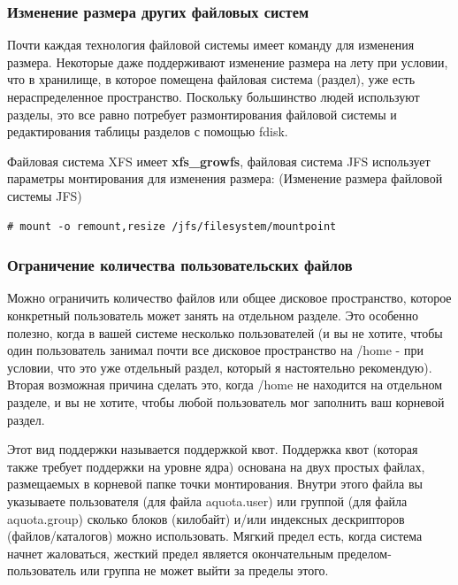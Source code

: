 \documentclass[10pt]{book}
\begin{document}
\subsubsection{Изменение размера других файловых систем}

Почти каждая технология файловой системы имеет команду для изменения размера. Некоторые даже поддерживают изменение размера на лету при условии, что в хранилище, в которое помещена файловая система (раздел), уже есть нераспределенное пространство. Поскольку большинство людей используют разделы, это все равно потребует размонтирования файловой системы и редактирования таблицы разделов с помощью fdisk.

Файловая система XFS имеет \textbf{xfs\_growfs}, файловая система JFS использует параметры монтирования для изменения размера:
(Изменение размера файловой системы JFS)

\begin{tcolorbox} 
\begin{lstlisting}
# mount -o remount,resize /jfs/filesystem/mountpoint
\end{lstlisting}
\end{tcolorbox}

\subsubsection{Ограничение количества пользовательских файлов}

Можно ограничить количество файлов или общее дисковое пространство, которое конкретный пользователь может занять на отдельном разделе. Это особенно полезно, когда в вашей системе несколько пользователей (и вы не хотите, чтобы один пользователь занимал почти все дисковое пространство на /home - при условии, что это уже отдельный раздел, который я настоятельно рекомендую). Вторая возможная причина сделать это, когда /home не находится на отдельном разделе, и вы не хотите, чтобы любой пользователь мог заполнить ваш корневой раздел.

Этот вид поддержки называется поддержкой квот. Поддержка квот (которая также требует поддержки на уровне ядра) основана на двух простых файлах, размещаемых в корневой папке точки монтирования. Внутри этого файла вы указываете пользователя (для файла aquota.user) или группой (для файла aquota.group) сколько блоков (килобайт) и/или индексных дескрипторов (файлов/каталогов) можно использовать. Мягкий предел есть, когда система начнет жаловаться, жесткий предел является окончательным пределом-пользователь или группа не может выйти за пределы этого.
\end{document}
